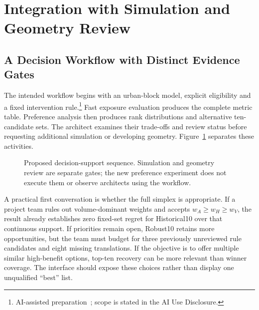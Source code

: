 \documentclass{llncs}
\newcommand{\aidraft}{\footnote{AI-assisted preparation~\cite{openai2026}; scope is stated in the AI Use Disclosure.}}
\begin{document}
\section{Integration with Simulation and Geometry Review}
\subsection{A Decision Workflow with Distinct Evidence Gates}
The intended workflow begins with an urban-block model, explicit eligibility and a fixed intervention rule.\aidraft{} Fast exposure evaluation produces the complete metric table. Preference analysis then produces rank distributions and alternative ten-candidate sets. The architect examines their trade-offs and review status before requesting additional simulation or developing geometry. Figure~\ref{fig:workflow} separates these activities.

\begin{figure}[tbp]\centering
{}
\caption{Proposed decision-support sequence. Simulation and geometry review are separate gates; the new preference experiment does not execute them or observe architects using the workflow.}\label{fig:workflow}\end{figure}

A practical first conversation is whether the full simplex is appropriate. If a project team rules out volume-dominant weights and accepts $w_A\geq w_H\geq w_V$, the result already establishes zero fixed-set regret for Historical10 over that continuous support. If priorities remain open, Robust10 retains more opportunities, but the team must budget for three previously unreviewed rule candidates and eight missing translations. If the objective is to offer multiple similar high-benefit options, top-ten recovery can be more relevant than winner coverage. The interface should expose these choices rather than display one unqualified ``best'' list.
\end{document}
